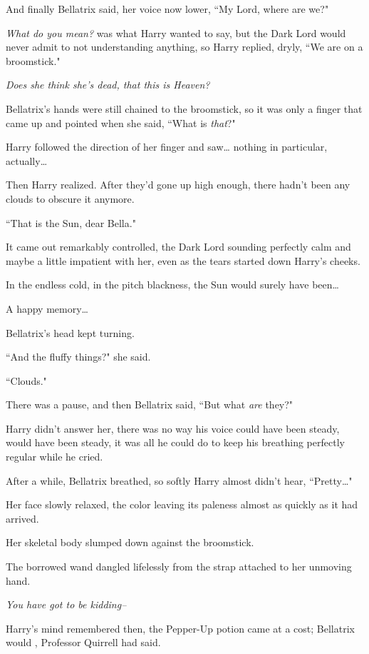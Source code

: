 And finally Bellatrix said, her voice now lower, ``My Lord, where are we?"

\emph{What do you mean?} was what Harry wanted to say, but the Dark Lord would never admit to not understanding anything, so Harry replied, dryly, ``We are on a broomstick."

\emph{Does she think she's dead, that this is Heaven?}

Bellatrix's hands were still chained to the broomstick, so it was only a finger that came up and pointed when she said, ``What is \emph{that}?"

Harry followed the direction of her finger and saw{\ldots} nothing in particular, actually{\ldots}

Then Harry realized. After they'd gone up high enough, there hadn't been any clouds to obscure it anymore.

``That is the Sun, dear Bella."

It came out remarkably controlled, the Dark Lord sounding perfectly calm and maybe a little impatient with her, even as the tears started down Harry's cheeks.

In the endless cold, in the pitch blackness, the Sun would surely have been{\ldots}

A happy memory{\ldots}

Bellatrix's head kept turning.

``And the fluffy things?" she said.

``Clouds."

There was a pause, and then Bellatrix said, ``But what \emph{are} they?"

Harry didn't answer her, there was no way his voice could have been steady, would have been steady, it was all he could do to keep his breathing perfectly regular while he cried.

After a while, Bellatrix breathed, so softly Harry almost didn't hear, ``Pretty{\ldots}"

Her face slowly relaxed, the color leaving its paleness almost as quickly as it had arrived.

Her skeletal body slumped down against the broomstick.

The borrowed wand dangled lifelessly from the strap attached to her unmoving hand.

\emph{You have \emph{got} to be \emph{kidding}\---}

Harry's mind remembered then, the Pepper-Up potion came at a cost; Bellatrix would , Professor Quirrell had said.

